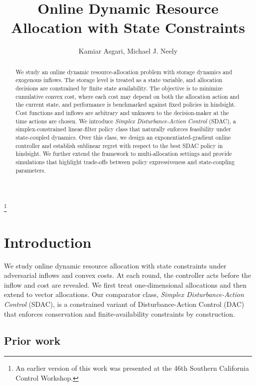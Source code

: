\documentclass[11pt]{article}
\title{Online Dynamic Resource Allocation with State Constraints}
\author{Kamiar Asgari, Michael J. Neely}
\date{}
\newcommand{\BlankFootnote}[1]{%
    \begingroup
    \renewcommand\thefootnote{}
    \footnote{#1}%
    \addtocounter{footnote}{-1}%
    \endgroup
}
\begin{document}
\maketitle

\BlankFootnote{An earlier version of this work was presented at the 46th Southern California Control Workshop.}

\begin{abstract}
We study an online dynamic resource-allocation problem with storage dynamics and exogenous inflows. The storage level is treated as a state variable, and allocation decisions are constrained by finite state availability. The objective is to minimize cumulative convex cost, where each cost may depend on both the allocation action and the current state, and performance is benchmarked against fixed policies in hindsight. Cost functions and inflows are arbitrary and unknown to the decision-maker at the time actions are chosen. We introduce \emph{Simplex Disturbance-Action Control} (SDAC), a simplex-constrained linear-filter policy class that naturally enforces feasibility under state-coupled dynamics. Over this class, we design an exponentiated-gradient online controller and establish sublinear regret with respect to the best SDAC policy in hindsight. We further extend the framework to multi-allocation settings and provide simulations that highlight trade-offs between policy expressiveness and state-coupling parameters.
\end{abstract}

\section{Introduction}

\label{Section:ChapControl}

We study online dynamic resource allocation with state constraints under adversarial inflows and convex costs. At each round, the controller acts before the inflow and cost are revealed. We first treat one-dimensional allocations and then extend to vector allocations. Our comparator class, \emph{Simplex Disturbance-Action Control} (SDAC), is a constrained variant of Disturbance-Action Control (DAC) \cite{hazan_introduction_2025} that enforces conservation and finite-availability constraints by construction.



\subsection{Prior work}
\end{document}
